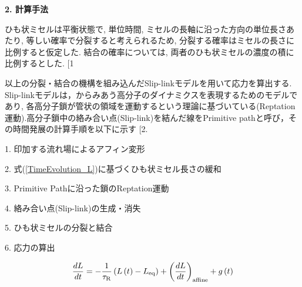 \documentclass[twocolumns,10pt,a4j]{jarticle}
\makeatletter
\DeclareRobustCommand\cite{\unskip
  \@ifnextchar[{\@tempswatrue\@citex}{\@tempswafalse\@citex[]}}
\makeatother
\begin{document}
      \vspace{0.5truemm}
      \noindent
      {\bf \large 2. 計算手法}
      \par
      ひも状ミセルは平衡状態で, 単位時間, ミセルの長軸に沿った方向の単位長さあたり, 等しい確率で分裂すると考えられるため, 分裂する確率はミセルの長さに比例すると仮定した. 結合の確率については, 両者のひも状ミセルの濃度の積に比例するとした.\cite{1} 
      \par
      以上の分裂・結合の機構を組み込んだSlip-linkモデルを用いて応力を算出する. Slip-linkモデルは，からみあう高分子のダイナミクスを表現するためのモデルであり, 各高分子鎖が管状の領域を運動するという理論に基づいている(Reptation運動).高分子鎖中の絡み合い点(Slip-link)を結んだ線をPrimitive pathと呼び，その時間発展の計算手順を以下に示す\cite{2}.
      \par 1. 印加する流れ場によるアフィン変形
      \par 2. 式(\ref{TimeEvolution_L})に基づくひも状ミセル長さの緩和
      \par 3. Primitive Pathに沿った鎖のReptation運動
      \par 4. 絡み合い点(Slip-link)の生成・消失
      \par 5. ひも状ミセルの分裂と結合
      \par 6. 応力の算出\\
      \vspace{-10truemm}

      \begin{equation}
        \frac{dL}{dt}=-\frac{1}{\tau_{\rm R}}\left( L\left(t\right)-L_{\rm eq}\right)
	  +\left(\frac{dL}{dt}\right)_{\rm affine}+g\left(t\right)
        \label{TimeEvolution_L}
      \end{equation}

      \vspace{-2.0truemm}

\end{document}
